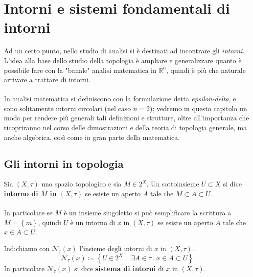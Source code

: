 \section{Intorni e sistemi fondamentali di intorni}
Ad un certo punto, nello studio di analisi si è destinati ad incontrare gli \textit{intorni}. \\ L'idea alla base dello studio della topologia è ampliare e generalizzare quanto è possibile fare con la "banale" analisi matematica in $\mathbb{R}^n$, quindi è più che naturale arrivare a trattare di intorni. \\ \\ In analisi matematica si definiscono con la formulazione detta \textit{epsilon-delta}, e sono solitamente intorni circolari (nel caso $n=2$); vedremo in questo capitolo un modo per rendere più generali tali definizioni e strutture, oltre all'importanza che ricopriranno nel corso delle dimostrazioni e della teoria di topologia generale, ma anche algebrica, così come in gran parte della matematica.



\subsection{\textcolor{TopGener}{\textbf{Gli intorni in topologia}}}




\begin{definition}
	Sia $(X,\tau)$ uno spazio topologico e sia $M \in 2^X$. Un sottoinsieme $U \subset X$ si dice \textbf{intorno di $M$ in $(X,\tau)$} se esiste un aperto $A$ tale che $M \subset A \subset U$. \\ \\ In particolare se $M$ è un insieme singoletto si può semplificare la scrittura a $M = \left\{m\right\}$, quindi $U$ è un intorno di $x$ in $(X,\tau)$ se esiste un aperto $A$ tale che $x \in A \subset U$.
\end{definition}

\begin{definition}
	Indichiamo con $\mathcal{N}_\tau(x)$ l'insieme degli intorni di $x$ in $(X,\tau)$. 
	\begin{equation*}
		\mathcal{N}_\tau(x) \coloneqq \left\{ U \in 2^X \,\middle|\, \exists A \in \tau\ .\ x \in A \subset U \right\}
	\end{equation*}
	In particolare $\mathcal{N}_\tau(x)$ si dice \textbf{sistema di intorni} di $x$ in $(X, \tau)$.
\end{definition}

